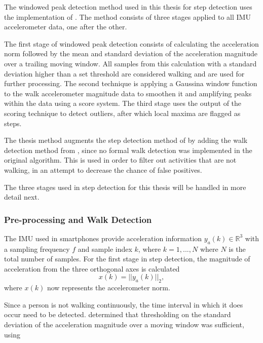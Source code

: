 The windowed peak detection method used in this thesis for step detection uses the implementation of \citet{Salvi2018}. The method consists of three stages applied to all \ac{IMU} accelerometer data, one after the other. \par  
The first stage of windowed peak detection consists of calculating the acceleration norm followed by the mean and standard deviation of the acceleration magnitude over a trailing moving window. All samples from this calculation with a standard deviation higher than a set threshold are considered walking and are used for further processing. The second technique is applying a Gaussina window function to the walk accelerometer magnitude data to smoothen it and amplifying peaks within the data using a score system. The third stage uses the output of the scoring technique to detect outliers, after which local maxima are flagged as steps.\par  

The thesis method augments the step detection method of \cite{Salvi2018} by adding the walk detection method from \cite{Brajdic2013}, since no formal walk detection was implemented in the original algorithm. This is used in order to filter out activities that are not walking, in an attempt to decrease the chance of false positives.\par 

The three stages used in step detection for this thesis will be handled in more detail next.

\subsubsection{Pre-processing and Walk Detection}
	 The \ac{IMU} used in smartphones provide acceleration information  $ y_a(k) \in \mathbb{R}^3 $ with a sampling frequency $ f $ and sample index $ k $, where $ k = 1,...,N $ where $ N $ is the total number of samples. For the first stage in step detection, the magnitude of acceleration from the three orthogonal axes is calculated 
			\begin{equation}\label{key}
		x(k) = ||y_a(k)||_2,
	\end{equation} 
	where $ x(k) $ now represents the accelerometer norm. \par 
	Since a person is not walking continuously, the time interval in which it does occur need to be detected. \citet{Brajdic2013} determined that thresholding on the standard deviation of the acceleration magnitude over a moving window was sufficient, using 
	
